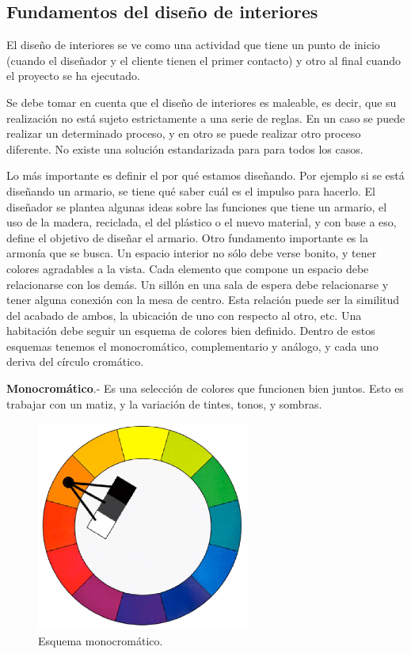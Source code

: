 \subsection{Fundamentos del diseño de interiores}
El diseño de interiores se ve como una actividad que tiene un punto de inicio (cuando el diseñador y el cliente tienen el primer contacto) y otro al final cuando el proyecto se ha ejecutado.\par
Se debe tomar en cuenta que el diseño de interiores es maleable, es decir, que su realización no está sujeto estrictamente a una serie de reglas. En un caso se puede realizar un determinado proceso, y en otro se puede realizar otro proceso diferente. No existe una solución estandarizada para para todos los casos.\par
Lo más importante es definir el por qué estamos diseñando. Por ejemplo si se está diseñando un armario, se tiene qué saber cuál es el impulso para hacerlo. El diseñador se plantea algunas ideas sobre las funciones que tiene un armario, el uso de la madera, reciclada, el del plástico o el nuevo material, y con base a eso, define el objetivo de diseñar el armario.
Otro fundamento importante es la armonía que se busca. Un espacio interior no sólo debe verse bonito, y tener colores agradables a la vista. Cada elemento que compone un espacio debe relacionarse con los demás. Un sillón en una sala de espera debe relacionarse y tener alguna conexión con la mesa de centro. Esta relación puede ser la similitud del acabado de ambos, la ubicación de uno con respecto al otro, etc.
Una habitación debe seguir un esquema de colores bien definido. Dentro de estos esquemas tenemos el monocromático, complementario y análogo, y cada uno deriva del círculo cromático.\par

\textbf{Monocromático}.- Es una selección de colores que funcionen bien juntos. Esto es trabajar con un matiz, y la variación de tintes, tonos, y sombras.
\begin{figure}[h!]
	\centering
	\includegraphics[width=7cm]{imagenes/marcoteorico/disenointeriores/monocromatico.png}
	\caption{Esquema monocromático.\cite{B13}}
	\label{fig:monocromatico}
\end{figure}

